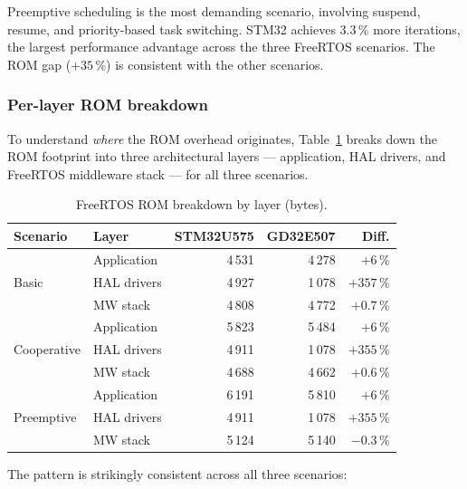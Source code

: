 Preemptive scheduling is the most demanding scenario, involving suspend, resume, and
priority-based task switching. STM32 achieves 3.3\,\% more iterations, the largest
performance advantage across the three FreeRTOS scenarios. The ROM gap ($+35\,\%$) is
consistent with the other scenarios.

\subsubsection{Per-layer ROM breakdown}
\label{sec:gd32-freertos-rom-breakdown}

To understand \emph{where} the ROM overhead originates, Table~\ref{tab:gd32-freertos-rom}
breaks down the ROM footprint into three architectural layers --- application, HAL drivers,
and FreeRTOS middleware stack --- for all three scenarios.

\begin{table}[H]
  \centering
  \caption{FreeRTOS ROM breakdown by layer (bytes).}
  \label{tab:gd32-freertos-rom}
  \begin{tabular}{l l r r r}
    \toprule
    \textbf{Scenario} & \textbf{Layer} & \textbf{STM32U575} & \textbf{GD32E507}
        & \textbf{Diff.} \\
    \midrule
    \multirow{3}{*}{Basic}
      & Application & 4\,531  & 4\,278 & $+6\,\%$ \\
      & HAL drivers & 4\,927  & 1\,078 & $+357\,\%$ \\
      & MW stack    & 4\,808  & 4\,772 & $+0.7\,\%$ \\
    \midrule
    \multirow{3}{*}{Cooperative}
      & Application & 5\,823  & 5\,484 & $+6\,\%$ \\
      & HAL drivers & 4\,911  & 1\,078 & $+355\,\%$ \\
      & MW stack    & 4\,688  & 4\,662 & $+0.6\,\%$ \\
    \midrule
    \multirow{3}{*}{Preemptive}
      & Application & 6\,191  & 5\,810 & $+6\,\%$ \\
      & HAL drivers & 4\,911  & 1\,078 & $+355\,\%$ \\
      & MW stack    & 5\,124  & 5\,140 & $-0.3\,\%$ \\
    \bottomrule
  \end{tabular}
\end{table}

The pattern is strikingly consistent across all three scenarios:

